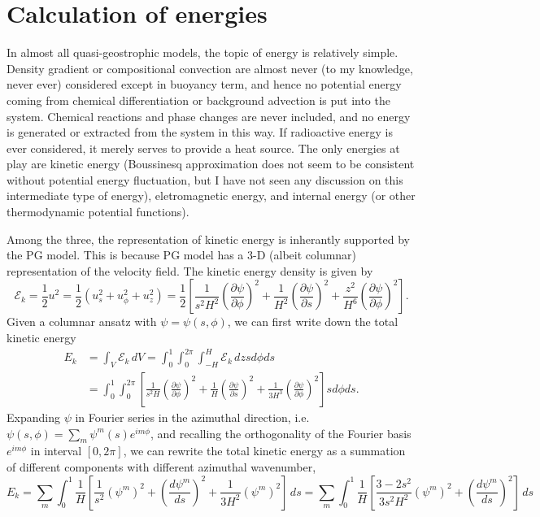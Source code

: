 \section{Calculation of energies}

In almost all quasi-geostrophic models, the topic of energy is relatively simple.
Density gradient or compositional convection are almost never (to my knowledge, never ever) considered except in buoyancy term, and hence no potential energy coming from chemical differentiation or background advection is put into the system. 
Chemical reactions and phase changes are never included, and no energy is generated or extracted from the system in this way.
If radioactive energy is ever considered, it merely serves to provide a heat source.
The only energies at play are kinetic energy (Boussinesq approximation does not seem to be consistent without potential energy fluctuation, but I have not seen any discussion on this intermediate type of energy), eletromagnetic energy, and internal energy (or other thermodynamic potential functions).

Among the three, the representation of kinetic energy is inherantly supported by the PG model.
This is because PG model has a 3-D (albeit columnar) representation of the velocity field.
The kinetic energy density is given by
\[
    \mathcal{E}_k = \frac{1}{2} u^2 = \frac{1}{2} \left(u_s^2 + u_\phi^2 + u_z^2\right) = \frac{1}{2} \left[\frac{1}{s^2H^2} \left(\frac{\partial \psi}{\partial \phi}\right)^2 + \frac{1}{H^2} \left(\frac{\partial \psi}{\partial s}\right)^2 + \frac{z^2}{H^6} \left(\frac{\partial \psi}{\partial \phi}\right)^2\right].
\]
Given a columnar ansatz with $\psi = \psi(s, \phi)$, we can first write down the total kinetic energy
\begin{equation}\begin{aligned}
    E_k &= \int_V \mathcal{E}_k \, dV = \int_{0}^{1} \int_{0}^{2\pi} \int_{-H}^{H} \mathcal{E}_k \, dz s d\phi ds \\ 
    &= \int_{0}^{1} \int_{0}^{2\pi} \left[\frac{1}{s^2H} \left(\frac{\partial \psi}{\partial \phi}\right)^2 + \frac{1}{H} \left(\frac{\partial \psi}{\partial s}\right)^2 + \frac{1}{3H^3} \left(\frac{\partial \psi}{\partial \phi}\right)^2\right] s d\phi ds.
\end{aligned}\end{equation}
Expanding $\psi$ in Fourier series in the azimuthal direction, i.e. $\psi(s, \phi) = \sum_m \psi^m(s) e^{im\phi}$, and recalling the orthogonality of the Fourier basis $e^{im\phi}$ in interval $[0, 2\pi]$, we can rewrite the total kinetic energy as a summation of different components with different azimuthal wavenumber,
\[
    E_k = \sum_m \int_0^1 \frac{1}{H} \left[\frac{1}{s^2} \left(\psi^m\right)^2 + \left(\frac{d \psi^m}{d s}\right)^2 + \frac{1}{3H^2} \left(\psi^m\right)^2\right] \, ds = \sum_m \int_0^1 \frac{1}{H} \left[\frac{3-2s^2}{3s^2H^2} \left(\psi^m\right)^2 + \left(\frac{d \psi^m}{d s}\right)^2\right] \, ds
\]


